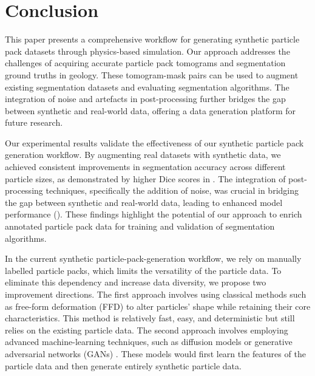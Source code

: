 \documentclass[preprint,12pt]{elsarticle}
\begin{document}
\section{Conclusion}
This paper presents a comprehensive workflow for generating synthetic particle pack datasets through physics-based simulation. 
Our approach addresses the challenges of acquiring accurate particle pack tomograms and segmentation ground truths in geology. 
These tomogram-mask pairs can be used to augment existing segmentation datasets and evaluating segmentation algorithms. 
The integration of noise and artefacts in post-processing further bridges the gap between synthetic and real-world data, offering a data generation platform for future research. 
\par
Our experimental results validate the effectiveness of our synthetic particle pack generation workflow. 
By augmenting real datasets with synthetic data, we achieved consistent improvements in segmentation accuracy across different particle sizes, as demonstrated by higher Dice scores in . 
The integration of post-processing techniques, specifically the addition of noise, was crucial in bridging the gap between synthetic and real-world data, leading to enhanced model performance (). 
These findings highlight the potential of our approach to enrich annotated particle pack data for training and validation of segmentation algorithms.
\par
In the current synthetic particle-pack-generation workflow, we rely on manually labelled particle packs, which limits the versatility of the particle data. 
To eliminate this dependency and increase data diversity, we propose two improvement directions. 
The first approach involves using classical methods such as free-form deformation (FFD) \cite{sederberg1986free} to alter particles' shape while retaining their core characteristics. 
This method is relatively fast, easy, and deterministic but still relies on the existing particle data.
The second approach involves employing advanced machine-learning techniques, such as diffusion models \cite{ho2020denoising} or generative adversarial networks (GANs) \cite{goodfellow2014generativea}. 
These models would first learn the features of the particle data and then generate entirely synthetic particle data. 

\end{document}
